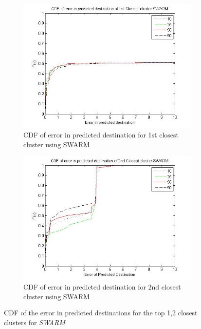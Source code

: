 \begin{figure}
    \centering
    \begin{subfigure}[t]{.5\textwidth}
        \centering
        \includegraphics[scale=0.4]{figs/swarm_top.jpg}
        \caption{CDF of error in predicted destination for 1st closest cluster using SWARM}
    \end{subfigure}%
	\begin{subfigure}[t]{.5\textwidth}
        \centering
        \includegraphics[scale=0.4]{figs/swarm_top2.jpg}
        \caption{CDF of error in predicted destination for 2nd closest cluster using SWARM}
    \end{subfigure}
   \caption{CDF of the error in predicted destinations for the top 1,2 closest clusters for \emph{SWARM}}
    \label{fig:nextloc_SWARM}       
\end{figure}


